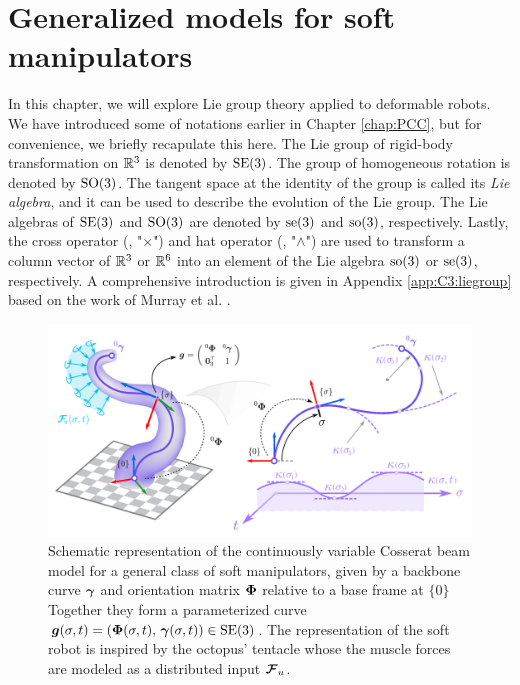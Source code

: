 \section{Generalized models for soft manipulators} \label{sec:chap3_model}
In this chapter, we will explore Lie group theory applied to deformable robots. We have introduced some of notations earlier in Chapter \ref{chap:PCC}, but for convenience, we briefly recapulate this here. The Lie group of rigid-body transformation on $\mathbb{R}^3$ is denoted by $\textup{\textrm{SE}}(3)$. The group of homogeneous rotation is denoted by $\textup{\textrm{SO}}(3)$. The tangent space at the identity of the group is called its \textit{Lie algebra}, and it can be used to describe the evolution of the Lie group. The Lie algebras of $\textup{\textrm{SE}}(3)$ and $\textup{\textrm{SO}}(3)$ are denoted by $\textup{\textrm{se}}(3)$ and $\textup{\textrm{so}}(3)$, respectively. Lastly, the cross operator (\ie, "$\times$") and hat operator (\ie, "$\wedge$") are used to transform a column vector of $\mathbb{R}^3$ or $\mathbb{R}^6$ into an element of the Lie algebra $\textup{\textrm{so}}(3)$ or $\textup{\textrm{se}}(3)$, respectively. A comprehensive introduction is given in Appendix \ref{app:C3:liegroup} based on the work of Murray et al. \cite{Murray1994}. 

\begin{figure}[!t]
  \vspace{-2mm}
  \centering
  \includegraphics[width = \textwidth]{./pdf/thesis-figure-5-1.pdf}
  \caption{Schematic representation of the continuously variable Cosserat beam model for a general class of soft manipulators, given by a backbone curve ${\boldsymbol{\gamma}}$ and orientation matrix ${\boldsymbol{\Phi}}$ relative to a base frame at $\{0\}$ Together they form a parameterized curve ${\boldsymbol{g}}(\sigma,t) = ({\boldsymbol{\Phi}}(\sigma,t),\, {\boldsymbol{\gamma}}(\sigma,t)) \in \textup{\textrm{SE}}(3)$. The representation of the soft robot is inspired by the octopus' tentacle whose the muscle forces are modeled as a distributed input ${\boldsymbol{\mathcal{F}}}_u$. \label{fig:C3:example1}}
\end{figure}


